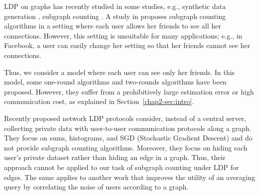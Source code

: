 LDP on graphs has recently studied in some studies, e.g., synthetic data generation \cite{Qin_CCS17}, subgraph counting \cite{Imola_USENIX21,Sun_CCS19,Ye_ICDE20,Ye_TKDE21}.
A study in
\cite{Sun_CCS19} proposes subgraph counting algorithms in a setting where each user
allows her friends to see all her connections.
However, this setting is unsuitable for
many applications; e.g., in Facebook, a user can easily change her setting so that
her friends cannot see her connections.



Thus, we consider a model where each user can see only her friends.
In this model, some one-round algorithms \cite{Ye_ICDE20,Ye_TKDE21}
and two-rounds algorithms\cite{Imola_USENIX21} have been proposed.
However, they suffer from a prohibitively large estimation error or high communication cost, as explained in Section~\ref{chap2-sec:intro}.

Recently proposed network LDP protocols \cite{Cyffers_arXiv21} consider, instead of a central server, collecting private data with user-to-user communication protocols along a graph. 
They focus on sums, histograms, and SGD (Stochastic Gradient Descent) and do not provide subgraph counting algorithms. 
Moreover, they focus on hiding each user's private dataset rather than hiding an edge in a graph. 
Thus, their approach cannot be applied to our task of subgraph counting under LDP for edges. 
The same applies to 
another work \cite{Sabater_arXiv21} 
that improves 
the utility of an averaging query
by correlating the noise of users according to a graph.


